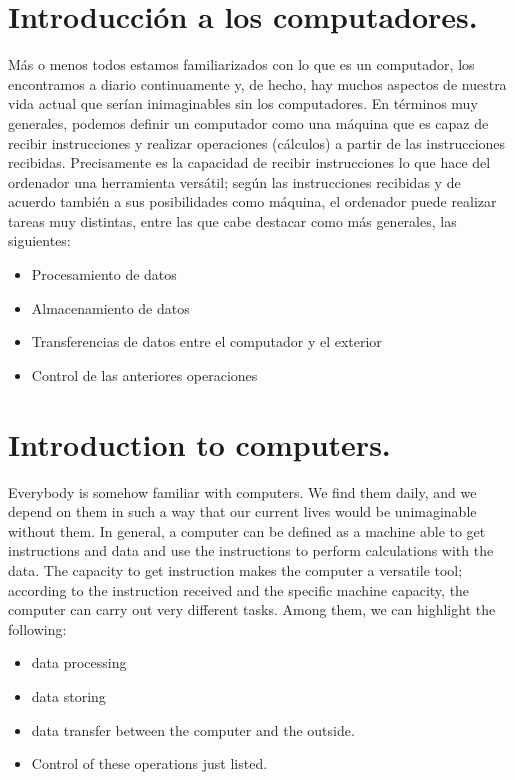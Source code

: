 \begin{paracol}{2}
\section {Introducción a los com\-putadores.}
Más o menos todos estamos familiarizados con lo que es un computador, los encontramos a diario continuamente  y, de hecho, hay muchos aspectos de nuestra vida actual que serían inimaginables sin los computadores.  En términos muy generales, podemos definir un computador como una máquina que es capaz de recibir instrucciones y realizar operaciones (cálculos) a partir de las instrucciones recibidas. Precisamente es la capacidad de recibir instrucciones lo que hace del ordenador una herramienta versátil; según las instrucciones recibidas y de acuerdo también a sus posibilidades como máquina,  el ordenador puede realizar tareas muy distintas, entre las que cabe destacar como más generales, las siguientes:
\begin{itemize}
\item Procesamiento de datos 
\item Almacenamiento de datos
\item Transferencias de datos entre el computador y el exterior
\item Control de las anteriores operaciones
\end{itemize}

\switchcolumn
\section{Introduction to compu\-ters.} 
Everybody is somehow familiar with computers. We find them daily, and we depend on them in such a way that our current lives would be unimaginable without them. In general, a computer can be defined as a machine able to get instructions and data and use the instructions to perform calculations with the data. The capacity to get instruction makes the computer a versatile tool; according to the instruction received and the specific machine capacity, the computer can carry out very different tasks. Among them, we can highlight the following:
\begin{itemize}
\item data processing
\item data storing
\item data transfer between the computer and the outside.
\item Control of these operations just listed.
\end{itemize}    


\end{paracol}
